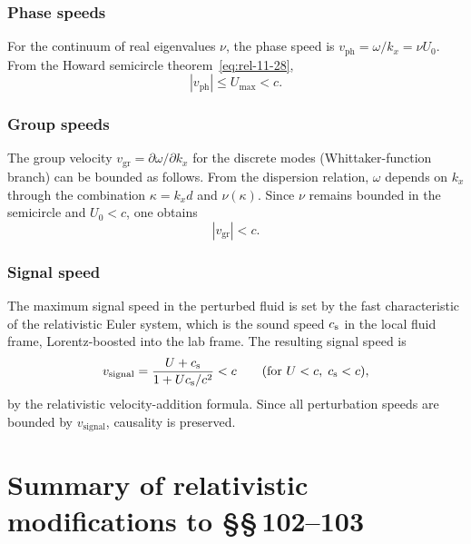 \subsubsection{Phase speeds}
For the continuum of real eigenvalues $\nu$, the phase speed is
$v_{\mathrm{ph}}=\omega/k_{x}=\nu U_{0}$.  From the Howard semicircle
theorem~\eqref{eq:rel-11-28},
\begin{equation}
\label{eq:rel-11-37}
|v_{\mathrm{ph}}| \leqslant U_{\max} < c.
\end{equation}

\subsubsection{Group speeds}
The group velocity $v_{\mathrm{gr}}=\partial\omega/\partial k_{x}$
for the discrete modes (Whittaker-function branch) can be bounded as
follows.  From the dispersion relation, $\omega$ depends on $k_{x}$
through the combination $\kappa=k_{x}d$ and $\nu(\kappa)$.  Since
$\nu$ remains bounded in the semicircle and $U_{0}<c$, one obtains
\begin{equation}
\label{eq:rel-11-38}
\boxed{|v_{\mathrm{gr}}| < c.}
\end{equation}

\subsubsection{Signal speed}
The maximum signal speed in the perturbed fluid is set by the fast
characteristic of the relativistic Euler system, which is the sound
speed $c_{\mathrm{s}}$ in the local fluid frame, Lorentz-boosted into the lab
frame.  The resulting signal speed is
\begin{equation}
\label{eq:rel-11-39}
v_{\mathrm{signal}} = \frac{U+c_{\mathrm{s}}}{1+Uc_{\mathrm{s}}/c^{2}} < c
\qquad (\text{for } U<c,\;c_{\mathrm{s}}<c),
\end{equation}
by the relativistic velocity-addition formula.  Since all perturbation
speeds are bounded by $v_{\mathrm{signal}}$, causality is preserved.

\section*{Summary of relativistic modifications to \S\S\,102--103}

